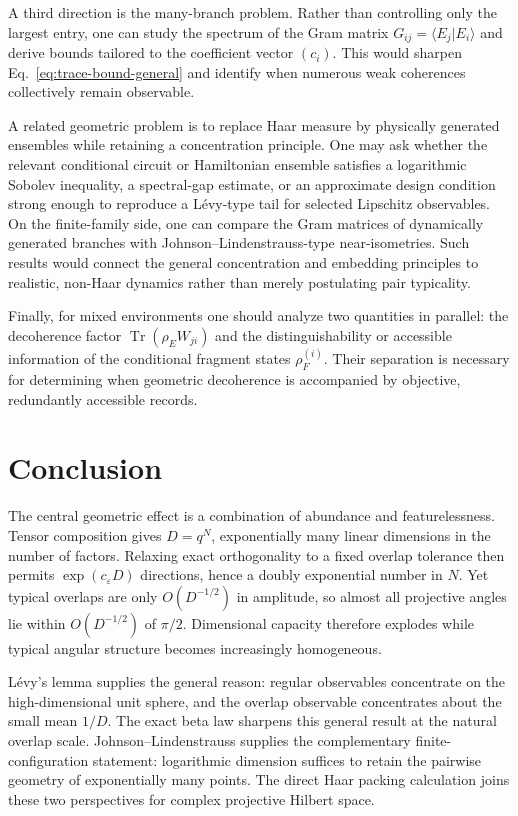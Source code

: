 \documentclass[aps,pra,reprint,superscriptaddress,nofootinbib,longbibliography]{revtex4-2}
\newcommand{\Tr}{\operatorname{Tr}}
\newcommand{\eps}{\varepsilon}
\begin{document}
A third direction is the many-branch problem.  Rather than controlling only
the largest entry, one can study the spectrum of the Gram matrix
$G_{ij}=\langle E_j|E_i\rangle$ and derive bounds tailored to the coefficient
vector $(c_i)$.  This would sharpen Eq.~\eqref{eq:trace-bound-general} and
identify when numerous weak coherences collectively remain observable.

A related geometric problem is to replace Haar measure by physically
generated ensembles while retaining a concentration principle.  One may ask
whether the relevant conditional circuit or Hamiltonian ensemble satisfies a
logarithmic Sobolev inequality, a spectral-gap estimate, or an approximate
design condition strong enough to reproduce a L\'evy-type tail for selected
Lipschitz observables.  On the finite-family side, one can compare the Gram
matrices of dynamically generated branches with Johnson--Lindenstrauss-type
near-isometries.  Such results would connect the general concentration and
embedding principles to realistic, non-Haar dynamics rather than merely
postulating pair typicality.

Finally, for mixed environments one should analyze two quantities in parallel:
the decoherence factor $\Tr(\rho_EW_{ji})$ and the distinguishability or
accessible information of the conditional fragment states
$\rho_F^{(i)}$.  Their separation is necessary for determining when geometric
decoherence is accompanied by objective, redundantly accessible records.

\section{Conclusion}

The central geometric effect is a combination of abundance and
featurelessness.  Tensor composition gives $D=q^N$, exponentially many
linear dimensions in the number of factors.  Relaxing exact orthogonality to
a fixed overlap tolerance then permits $\exp(c_\eps D)$ directions, hence a
doubly exponential number in $N$.  Yet typical overlaps are only
$O(D^{-1/2})$ in amplitude, so almost all projective angles lie within
$O(D^{-1/2})$ of $\pi/2$.  Dimensional capacity therefore explodes while
typical angular structure becomes increasingly homogeneous.

L\'evy's lemma supplies the general reason: regular observables concentrate
on the high-dimensional unit sphere, and the overlap observable concentrates
about the small mean $1/D$.  The exact beta law sharpens this general result
at the natural overlap scale.  Johnson--Lindenstrauss supplies the
complementary finite-configuration statement: logarithmic dimension suffices
to retain the pairwise geometry of exponentially many points.  The direct
Haar packing calculation joins these two perspectives for complex projective
Hilbert space.
\end{document}
